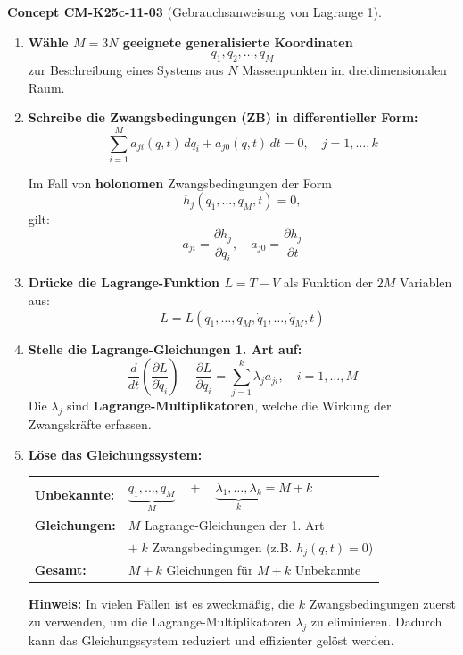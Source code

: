 \documentclass[10pt, letterpaper]{article}
\newcommand{\CustomHeading}[3]{%
  \par\medskip\noindent%
  \textbf{#1 #2} \textnormal{(#3)}.\enskip%
}
\newenvironment{CONC}[2]{\begin{unitbox}\CustomHeading{Concept}{#1}{#2}}{\end{unitbox}}
\begin{document}
\begin{CONC}{CM-K25c-11-03}{Gebrauchsanweisung von Lagrange 1}
\begin{enumerate}[label=\textbf{\arabic*)}, itemsep=1.5em]

\item \textbf{Wähle \( M = 3N \) geeignete generalisierte Koordinaten}  
\[
q_1, q_2, \dotsc, q_M
\]
zur Beschreibung eines Systems aus \( N \) Massenpunkten im dreidimensionalen Raum.

\item \textbf{Schreibe die Zwangsbedingungen (ZB) in differentieller Form:}
\[
\sum_{i=1}^M a_{ji}(q, t) \, dq_i + a_{j0}(q, t)\, dt = 0, \quad j = 1, \dotsc, k
\]

Im Fall von \textbf{holonomen} Zwangsbedingungen der Form
\[
h_j(q_1, \dotsc, q_M, t) = 0,
\]
gilt:
\[
a_{ji} = \frac{\partial h_j}{\partial q_i}, 
\quad
a_{j0} = \frac{\partial h_j}{\partial t}
\]

\item \textbf{Drücke die Lagrange-Funktion \( L = T - V \)} als Funktion der \( 2M \) Variablen aus:
\[
L = L(q_1, \dotsc, q_M, \dot{q}_1, \dotsc, \dot{q}_M, t)
\]

\item \textbf{Stelle die Lagrange-Gleichungen 1. Art auf:}
\[
\frac{d}{dt} \left( \frac{\partial L}{\partial \dot{q}_i} \right) 
- \frac{\partial L}{\partial q_i} 
= \sum_{j=1}^k \lambda_j a_{ji}, 
\quad i = 1, \dotsc, M
\]
Die \(\lambda_j\) sind \textbf{Lagrange-Multiplikatoren}, welche die Wirkung der Zwangskräfte erfassen.

\item \textbf{Löse das Gleichungssystem:}

\vspace{0.5em}
\noindent
\begin{tabular}{@{}ll}
\textbf{Unbekannte:} 
& \( \underbrace{q_1, \dotsc, q_M}_{M} 
\quad + \quad 
\underbrace{\lambda_1, \dotsc, \lambda_k}_{k} 
= M + k \) \\[1ex]

\textbf{Gleichungen:} 
& \( M \) Lagrange-Gleichungen der 1. Art \\[0.5ex]
& \( + \; k \) Zwangsbedingungen (z.B. \( h_j(q, t) = 0 \)) \\[1ex]

\textbf{Gesamt:} 
& \( M + k \) Gleichungen für \( M + k \) Unbekannte
\end{tabular}

\vspace{1.5em}
\noindent
\textbf{Hinweis:}  
In vielen Fällen ist es zweckmäßig, die \( k \) Zwangsbedingungen zuerst zu verwenden, um die Lagrange-Multiplikatoren \( \lambda_j \) zu eliminieren. Dadurch kann das Gleichungssystem reduziert und effizienter gelöst werden.

\end{enumerate}
\end{CONC}
\end{document}
